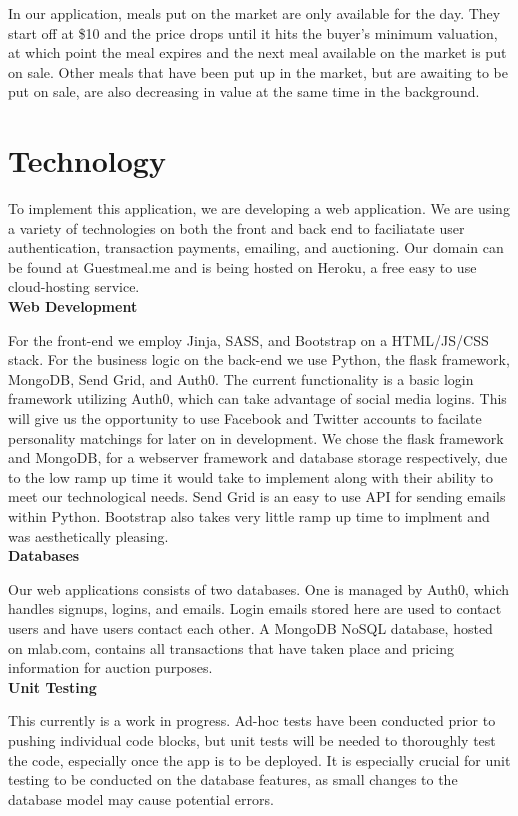 \documentclass[column,12pt]{article}
\begin{document}
In our application, meals put on the market are only available for the day. They start off at \$10 and the price drops until it hits the buyer's minimum valuation, at which point the meal expires and the next meal available on the market is put on sale. Other meals that have been put up in the market, but are awaiting to be put on sale, are also decreasing in value at the same time in the background. 

\section{Technology}
To implement this application, we are developing a web application. We are using a variety of technologies on both the front and back end to faciliatate user authentication, transaction payments, emailing, and auctioning. Our domain can be found at Guestmeal.me and is being hosted on Heroku, a free easy to use cloud-hosting service. \\

\textbf{Web Development}

For the front-end we employ Jinja, SASS, and Bootstrap on a HTML/JS/CSS stack. For the business logic on the back-end we use Python, the flask framework, MongoDB, Send Grid, and Auth0. The current functionality is a basic login framework utilizing Auth0, which can take advantage of social media logins. This will give us the opportunity to use  Facebook and Twitter accounts to facilate personality matchings for later on in development. We chose the flask framework and MongoDB, for
a webserver framework and database storage respectively, due to the low ramp up time it would take to implement along with their ability to meet our technological needs. Send Grid is an easy to use API for sending emails within Python. Bootstrap also takes very little ramp up time to implment and was aesthetically pleasing.\\

\textbf{Databases}

Our web applications consists of two databases. One is managed by Auth0, which handles signups, logins, and emails. Login emails stored here are used to contact users and have users contact each other. A MongoDB NoSQL database, hosted on mlab.com, contains all transactions that have taken place and pricing information for auction purposes. \\

\textbf{Unit Testing}

This currently is a work in progress. Ad-hoc tests have been conducted prior to pushing individual code blocks, but unit tests will be needed to thoroughly test the code, especially once the app is to be deployed. It is especially crucial for unit testing to be conducted on the database features, as small changes to the database model may cause potential errors. \\
\end{document}
